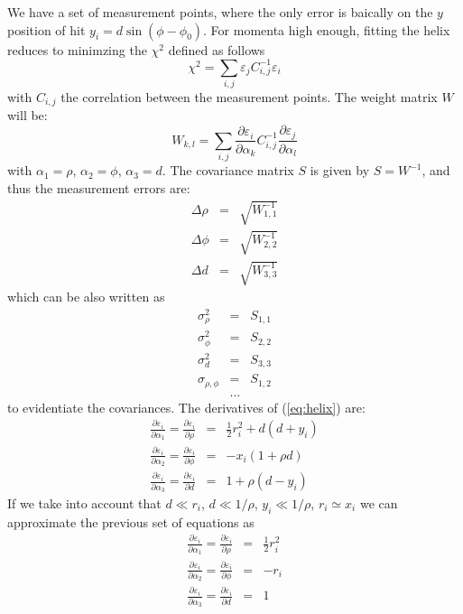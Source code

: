 \documentclass[10pt,a4paper]{article}
\begin{document}
We have a set of measurement points, where the only error is baically
on the $y$ position of hit $y_i = d \sin (\phi-\phi_0)$. For momenta
high enough, fitting the helix reduces to minimzing the $\chi^2$
defined as follows
\begin{equation}
  \chi^2 = \sum_{i,j} \varepsilon_j C^{-1}_{i,j} \varepsilon_i
\end{equation}
with $C_{i,j}$ the correlation between the measurement points. The
weight matrix $W$ will be:
\begin{equation}
  W_{k,l} = \sum_{i,j} \frac { \partial \varepsilon_i} {\partial \alpha_k} C^{-1}_{i,j}  \frac { \partial \varepsilon_j} {\partial \alpha_l}
\end{equation}
with $\alpha_1 = \rho$, $\alpha_2 = \phi$, $\alpha_3 = d$. The
covariance matrix $S$ is given by $S=W^{-1}$, and thus the measurement
errors are:
\begin{eqnarray}
\Delta \rho &=& \sqrt{W_{1,1}^{-1}} \nonumber \\
\Delta \phi &=& \sqrt{W_{2,2}^{-1}} \nonumber \\
\Delta d &=& \sqrt{W_{3,3}^{-1}} \nonumber
\end{eqnarray}
which can be also written as
\begin{eqnarray}
\sigma^2_\rho &=& S_{1,1} \nonumber \\
\sigma^2_\phi &=& S_{2,2} \nonumber \\
\sigma^2_d &=& S_{3,3} \nonumber \\
\sigma_{\rho, \phi} & = & S_{1,2} \nonumber \\
 & \ldots & \nonumber
\end{eqnarray}
to evidentiate the covariances. The derivatives of (\ref{eq:helix}) are:
\begin{eqnarray}
  \frac { \partial \varepsilon_i} {\partial \alpha_1} =
  \frac { \partial \varepsilon_i} {\partial \rho} &=& \frac 1 2 r_i^2 + d (d+y_i) \nonumber \\
  \frac { \partial \varepsilon_i} {\partial \alpha_2} =
  \frac { \partial \varepsilon_i} {\partial \phi} &=& - x_i (1+\rho d) \nonumber \\
  \frac { \partial \varepsilon_i} {\partial \alpha_3} =
  \frac { \partial \varepsilon_i} {\partial d} &=& 1 + \rho (d - y_i) \nonumber 
\end{eqnarray}
If we take into account that $d \ll r_i$, $d \ll 1/\rho$, $y_i \ll
1/\rho$, $r_i \simeq x_i$ we can approximate the previous set of
equations as
\begin{eqnarray}
\frac { \partial \varepsilon_i} {\partial \alpha_1} =
\frac { \partial \varepsilon_i} {\partial \rho} &=& \frac 1 2 r_i^2 \nonumber \\
\frac { \partial \varepsilon_i} {\partial \alpha_2} =
\frac { \partial \varepsilon_i} {\partial \phi} &=& - r_i  \nonumber \\
\frac { \partial \varepsilon_i} {\partial \alpha_3} =
\frac { \partial \varepsilon_i} {\partial d} &=& 1 \nonumber 
\end{eqnarray}
\end{document}
